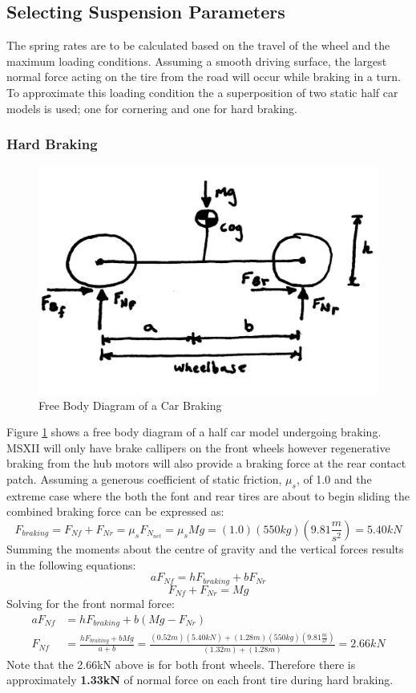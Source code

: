 \documentclass[12pt]{article}
\begin{document}
\subsection{Selecting Suspension Parameters}
\label{sec:paramSelection}
The spring rates are to be calculated based on the travel of the wheel and the maximum loading conditions. Assuming a smooth driving surface, the largest normal force acting on the tire from the road will occur while braking in a turn. To approximate this loading condition the a superposition of two static half car models is used; one for cornering and one for hard braking.  
\subsubsection{Hard Braking}\begin{figure}[h!]
	\centering
	\includegraphics[width=.5\textwidth]{./LaTex/brakingFBD.jpg}
	\caption{Free Body Diagram of a Car Braking}
	\label{fig:barkingFBD}
\end{figure}
Figure \ref{fig:barkingFBD} shows a free body diagram of a half car model undergoing braking. MSXII will only have brake callipers on the front wheels however regenerative braking from the hub motors will also provide a braking force at the rear contact patch. Assuming a generous coefficient of static friction, $\mu _s$, of 1.0 and the extreme case where the both the font and rear tires are about to begin sliding the combined braking force can be expressed as: 
\begin{equation}
	F_{braking} = F_{Nf} + F_{Nr} = \mu _s F_{N_{net}} =  \mu _s Mg = (1.0)(550kg)\left(9.81\frac{m}{s^2}\right) = 5.40kN
\end{equation}
Summing the moments about the centre of gravity and the vertical forces results in the following equations: 
\begin{equation}
	aF_{Nf} = hF_{braking} + bF_{Nr}
\end{equation}
\begin{equation}
	F_{Nf} + F_{Nr} = Mg
\end{equation}
Solving for the front normal force: 
\begin{equation}
\begin{split}
	aF_{Nf} &= hF_{braking} + b(Mg - F_{Nr})\\
	F_{Nf} &= \frac{hF_{braking} + bMg}{a+b} = \frac{(0.52m)(5.40kN)+(1.28m)(550kg)\left(9.81\frac{m}{s^2}\right)}{(1.32m)+(1.28m)} = 2.66kN
\end{split}
\end{equation}
Note that the 2.66kN above is for both front wheels. Therefore there is approximately \textbf{1.33kN} of normal force on each front tire during hard braking. 
\end{document}
